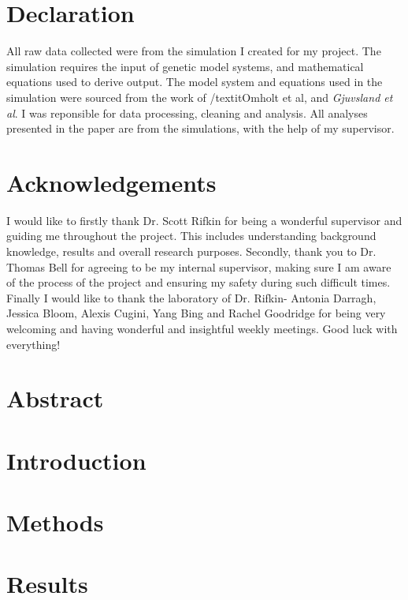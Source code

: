 \documentclass[11pt]{article}
\begin{document}


\newpage

\section{Declaration}
All raw data collected were from the simulation I created for my project. The simulation requires the input of genetic model systems, and mathematical equations used to derive output. The model system and equations used in the simulation were sourced from the work of /textit{Omholt et al,} and \textit{Gjuvsland et al}. I was reponsible for data processing, cleaning and analysis. All analyses presented in the paper are from the simulations, with the help of my supervisor.

\section{Acknowledgements}
I would like to firstly thank Dr. Scott Rifkin for being a wonderful supervisor and guiding me throughout the project. This includes understanding background knowledge, results and overall research purposes. Secondly, thank you to Dr. Thomas Bell for agreeing to be my internal supervisor, making sure I am aware of the process of the project and ensuring my safety during such difficult times.
\\Finally I would like to thank the laboratory of Dr. Rifkin- Antonia Darragh, Jessica Bloom, Alexis Cugini, Yang Bing and Rachel Goodridge for being very welcoming and having wonderful and insightful weekly meetings. Good luck with everything!

\newpage

\section{Abstract}

\newpage

\section{Introduction}


\section{Methods}


\section{Results}

\end{document}
